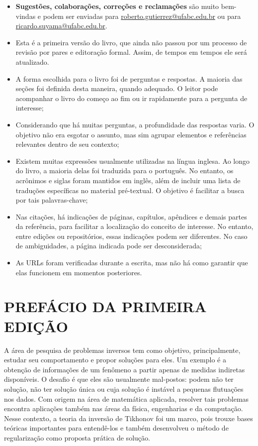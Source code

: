 \begin{itemize}
\item \textbf{Sugestões, colaborações, correções e reclamações} são muito bem-vindas e podem ser enviadas para \href{mailto:roberto.gutierrez@ufabc.edu.br}{roberto.gutierrez@ufabc.edu.br} ou para \href{mailto:ricardo.suyama@ufabc.edu.br}{ricardo.suyama@ufabc.edu.br}.
\item Esta é a primeira versão do livro, que ainda não passou por um processo de revisão por pares e editoração formal. Assim, de tempos em tempos ele será atualizado. 
\item A forma escolhida para o livro foi de perguntas e respostas. A maioria das seções foi definida desta maneira, quando adequado. O leitor pode acompanhar o livro do começo ao fim ou ir rapidamente para a pergunta de interesse; 
\item Considerando que há muitas perguntas, a profundidade das respostas varia. O objetivo não era esgotar o assunto, mas sim agrupar elementos e referências relevantes dentro de seu contexto;
\item Existem muitas expressões usualmente utilizadas na língua inglesa. Ao longo do livro, a maioria delas foi traduzida para o português. No entanto, os acrônimos e siglas foram mantidos em inglês, além de incluir uma lista de traduções específicas no material pré-textual. O objetivo é facilitar a busca por tais palavras-chave; 
\item Nas citações, há indicações de páginas, capítulos, apêndices e demais partes da referência, para facilitar a localização do conceito de interesse. No entanto, entre edições ou repositórios, essas indicações podem ser diferentes. No caso de ambiguidades, a página indicada pode ser desconsiderada;
\item As URLs foram verificadas durante a escrita, mas não há como garantir que elas funcionem em momentos posteriores. 
\end{itemize}

\vfill

\newpage
\thispagestyle{empty}
\section*{\centering PREFÁCIO DA PRIMEIRA EDIÇÃO}
A área de pesquisa de problemas inversos tem como objetivo, principalmente, estudar seu comportamento e propor soluções para eles. Um exemplo é a obtenção de informações de um fenômeno a partir apenas de medidas indiretas disponíveis. O desafio é que eles são usualmente mal-postos: podem não ter solução, não ter solução única ou cuja solução é instável a pequenas flutuações nos dados. Com origem na área de matemática aplicada, resolver tais problemas encontra aplicações também nas áreas da física, engenharias e da computação. Nesse contexto, a teoria da inversão de Tikhonov \cite{tikhonov1977solutions} foi um marco, pois trouxe bases teóricas importantes para entendê-los e também desenvolveu o método de regularização como proposta prática de solução. 

